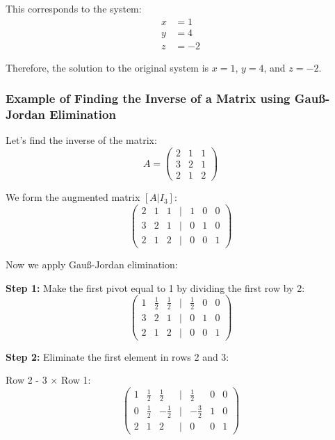 This corresponds to the system:
\begin{align*}
x &= 1 \\
y &= 4 \\
z &= -2
\end{align*}

Therefore, the solution to the original system is $x = 1$, $y = 4$, and $z = -2$.

\subsubsection{Example of Finding the Inverse of a Matrix using Gauß-Jordan Elimination}

Let's find the inverse of the matrix:
\begin{equation*}
A = 
\begin{pmatrix}
2 & 1 & 1 \\
3 & 2 & 1 \\
2 & 1 & 2
\end{pmatrix}
\end{equation*}

We form the augmented matrix $[A|I_3]$:
\begin{equation*}
\begin{pmatrix}
2 & 1 & 1 & | & 1 & 0 & 0 \\
3 & 2 & 1 & | & 0 & 1 & 0 \\
2 & 1 & 2 & | & 0 & 0 & 1
\end{pmatrix}
\end{equation*}

Now we apply Gauß-Jordan elimination:

\textbf{Step 1:} Make the first pivot equal to 1 by dividing the first row by 2:
\begin{equation*}
\begin{pmatrix}
1 & \frac{1}{2} & \frac{1}{2} & | & \frac{1}{2} & 0 & 0 \\
3 & 2 & 1 & | & 0 & 1 & 0 \\
2 & 1 & 2 & | & 0 & 0 & 1
\end{pmatrix}
\end{equation*}

\textbf{Step 2:} Eliminate the first element in rows 2 and 3:

Row 2 - 3 $\times$ Row 1:
\begin{equation*}
\begin{pmatrix}
1 & \frac{1}{2} & \frac{1}{2} & | & \frac{1}{2} & 0 & 0 \\
0 & \frac{1}{2} & -\frac{1}{2} & | & -\frac{3}{2} & 1 & 0 \\
2 & 1 & 2 & | & 0 & 0 & 1
\end{pmatrix}
\end{equation*}

